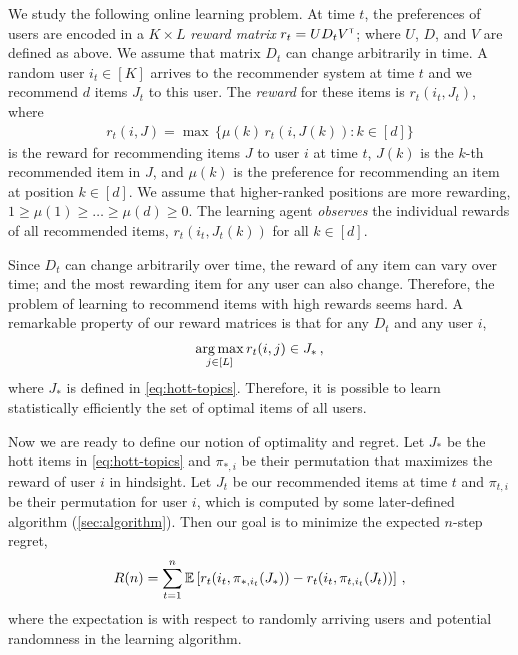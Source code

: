 We study the following online learning problem. At time $t$, the preferences of users are encoded in a $K \times L$ \emph{reward matrix} $r_t = U D_t V^\mathsf{\scriptscriptstyle T}$; where $U$, $D$, and $V$ are defined as above. We assume that matrix $D_t$ can change arbitrarily in time. A random user $i_t \in [K]$ arrives to the recommender system at time $t$ and we recommend $d$ items $J_t$ to this user. The \emph{reward} for these items is $r_t(i_t, J_t)$, where
\begin{align}
  r_t(i, J) =
  \max \, \{\mu(k) \, r_t(i, J(k)): k \in [d]\}
  \label{eq:reward}
\end{align}
is the reward for recommending items $J$ to user $i$ at time $t$, $J(k)$ is the $k$-th recommended item in $J$, and $\mu(k)$ is the preference for recommending an item at position $k \in [d]$. We assume that higher-ranked positions are more rewarding, $1 \geq \mu(1) \geq \dots \geq \mu(d) \geq 0$. The learning agent \emph{observes} the individual rewards of all recommended items, $r_t(i_t, J_t(k))$ for all $k \in [d]$.

Since $D_t$ can change arbitrarily over time, the reward of any item can vary over time; and the most rewarding item for any user can also change. Therefore, the problem of learning to recommend items with high rewards seems hard. A remarkable property of our reward matrices is that for any $D_t$ and any user $i$,
\begin{align*}
  \mathop{\rm arg\,max}_{j \in [L]} r_t(i, j) \in J_\ast\,,
\end{align*}
where $J_\ast$ is defined in \eqref{eq:hott-topics}. Therefore, it is possible to learn statistically efficiently the set of optimal items of all users.

Now we are ready to define our notion of optimality and regret. Let $J_\ast$ be the hott items in \eqref{eq:hott-topics} and $\pi_{\ast, i}$ be their permutation that maximizes the reward of user $i$ in hindsight. Let $J_t$ be our recommended items at time $t$ and $\pi_{t, i}$ be their permutation for user $i$, which is computed by some later-defined algorithm (\ref{sec:algorithm}). Then our goal is to minimize the expected $n$-step regret,
\begin{align*}
  R(n) =
  \sum_{t = 1}^n \mathbb{E}\left[r_t(i_t, \pi_{\ast, i_t}(J_\ast)) - r_t(i_t, \pi_{t, i_t}(J_t))\right]\,,
\end{align*}
where the expectation is with respect to randomly arriving users and potential randomness in the learning algorithm.

